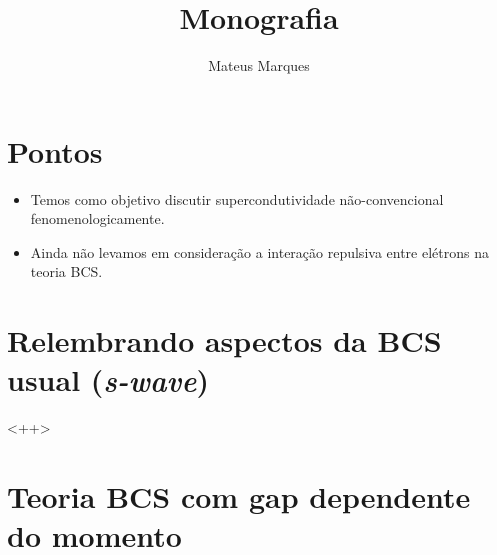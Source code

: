 \documentclass[a4paper,10pt]{article}
\title{\Huge{\textbf{Monografia}}}
\author{Mateus Marques}
\begin{document}
\maketitle

\section{Pontos}

\begin{itemize}
\item Temos como objetivo discutir supercondutividade não-convencional fenomenologicamente.
\item Ainda não levamos em consideração a interação repulsiva entre elétrons na teoria BCS.
\end{itemize}

\section{Relembrando aspectos da BCS usual (\textit{s-wave})}

<++>

\section{Teoria BCS com gap dependente do momento}
\end{document}
